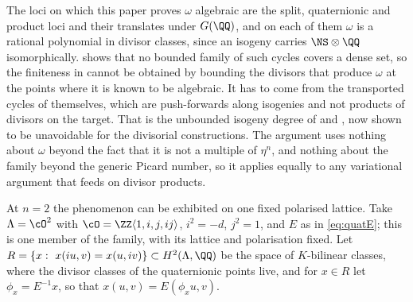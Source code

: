 \begin{remark}\label{rem:divroute}
The loci on which this paper proves $\omega$ algebraic are the split,
quaternionic and product loci and their translates under $G(\QQ)$, and on
each of them $\omega$ is a rational polynomial in divisor classes, since an
isogeny carries $\NS\otimes\QQ$ isomorphically.  shows that no
bounded family of such cycles covers a dense set, so the finiteness in
 cannot be obtained by bounding the divisors that
produce $\omega$ at the points where it is known to be algebraic. It has to
come from the transported cycles of  themselves, which
are push-forwards along isogenies and not products of divisors on the target.
That is the unbounded isogeny degree of  and
, now shown to be unavoidable for the divisorial
constructions. The argument uses nothing about $\omega$ beyond the fact that it
is not a multiple of $\eta^{n}$, and nothing about the family beyond the
generic Picard number, so it applies equally to any variational argument that
feeds on divisor products.
\end{remark}

At $n=2$ the phenomenon can be exhibited on one fixed polarised lattice. Take
$\Lambda=\cO^{2}$ with $\cO=\ZZ\langle1,i,j,ij\rangle$, $i^{2}=-d$, $j^{2}=1$,
and $E$ as in \eqref{eq:quatE}; this is one member of the family, with its
lattice and polarisation fixed. Let
$R=\{x:\ x(iu,v)=x(u,iv)\}\subset H^{2}(\Lambda,\QQ)$ be the space of
$K$-bilinear classes, where the divisor classes of the quaternionic points
live, and for $x\in R$ let $\phi_{x}=E^{-1}x$, so that $x(u,v)=E(\phi_{x}u,v)$.

